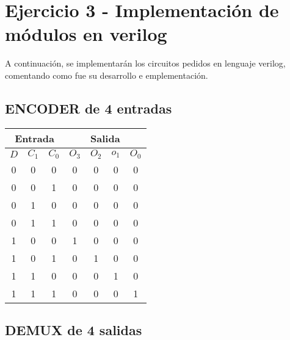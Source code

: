 \section{Ejercicio 3 - Implementación de módulos en verilog}
A continuación, se implementarán los circuitos pedidos en lenguaje verilog, comentando como fue su desarrollo e emplementación.
\subsection{ENCODER de 4 entradas}


\begin{table}[H]
	\begin{center}
		\begin{tabular}{|c|c|c||c|c|c|c|}
			\hline
			\multicolumn{3}{|c||}{Entrada} & \multicolumn{4}{|c|}{Salida}\\
			\hline
			$D$ &	$C_1$ &	$C_0$ &	$O_3$ & $O_2$ & $o_1$ &$O_0$ \\
			\hline
            0 & 0 & 0 & 0 & 0 & 0 & 0 \\
            \hline
            0 & 0 & 1 & 0 & 0 & 0 & 0 \\
            \hline
            0 & 1 & 0 & 0 & 0 & 0 & 0 \\
            \hline
            0 & 1 & 1 & 0 & 0 & 0 & 0 \\
            \hline
            1 & 0 & 0 & 1 & 0 & 0 & 0 \\
            \hline
            1 & 0 & 1 & 0 & 1 & 0 & 0 \\
            \hline
            1 & 1 & 0 & 0 & 0 & 1 & 0 \\
            \hline
            1 & 1 & 1 & 0 & 0 & 0 & 1\\
			\hline
		\end{tabular}
	\end{center}
\end{table}

\subsection{DEMUX de 4 salidas}

